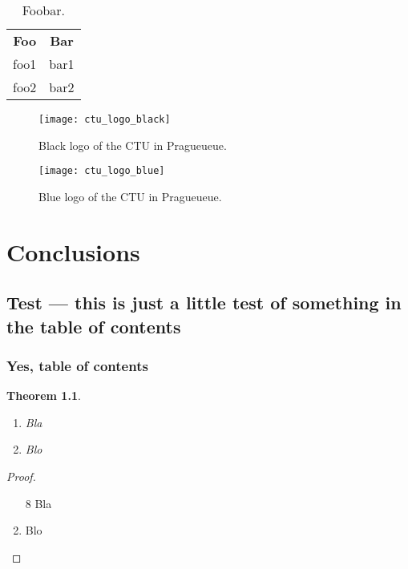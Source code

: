 \documentclass[twoside]{ctuthesis}
\theoremstyle{plain}
\newtheorem{theorem}{Theorem}[chapter]
\theoremstyle{definition}
\theoremstyle{note}
\begin{document}
\blindmathtrue

\blinddocument

\begin{table}
\begin{ctucolortab}
\begin{tabular}{cc}
\bfseries Foo & \bfseries Bar \\\Midrule
foo1 & bar1 \\
foo2 & bar2
\end{tabular}
\end{ctucolortab}
\caption{Foobar.}
\label{tab:foobar}
\end{table}

\begin{figure}
\texttt{[image: ctu\_logo\_black]}
\caption{Black logo of the CTU in Pragueueue.}
\end{figure}

\begin{figure}[!t]
\texttt{[image: ctu\_logo\_blue]}
\caption{Blue logo of the CTU in Pragueueue.}
\end{figure}

\chapter{Conclusions}

\section{Test --- this is just a little test of something in the table of contents}

\subsection{Yes, table of contents}

\begin{theorem}\begin{enumerate} \item Bla \item Blo \end{enumerate} \end{theorem}


\medskip

\begin{proof}\begin{enumerate} \item[8] Bla \item Blo \end{enumerate} \end{proof}

\appendix

\printindex

\appendix




\end{document}
